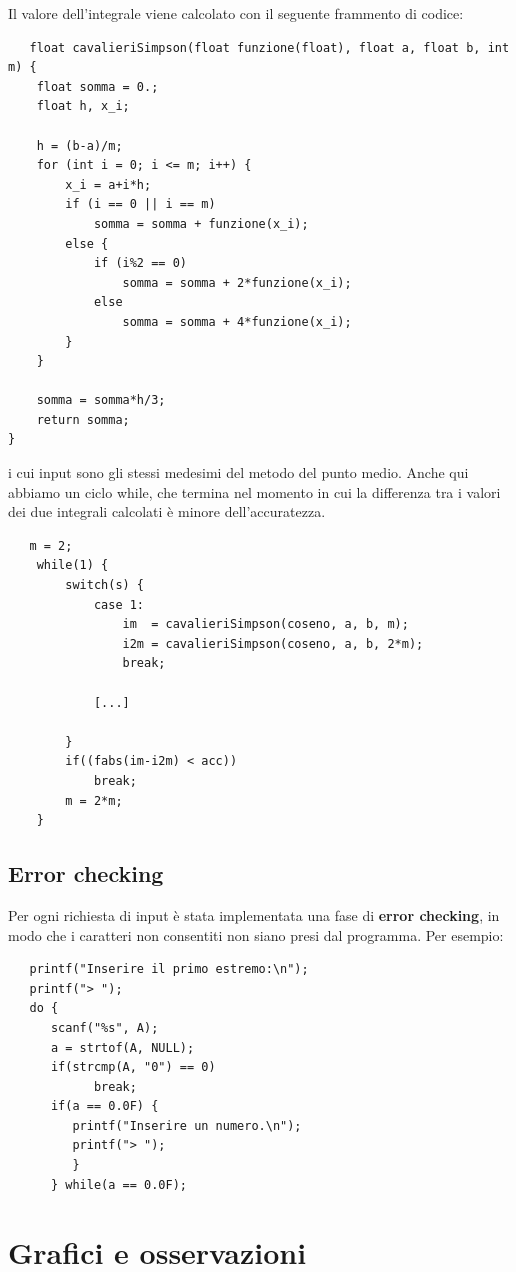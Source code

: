 \documentclass{article}
\begin{document}
Il valore dell'integrale viene calcolato con il seguente frammento di codice:
\begin{lstlisting}
   float cavalieriSimpson(float funzione(float), float a, float b, int m) {
    float somma = 0.;
    float h, x_i;

    h = (b-a)/m;
    for (int i = 0; i <= m; i++) {
        x_i = a+i*h;
        if (i == 0 || i == m)
            somma = somma + funzione(x_i);
        else {
            if (i%2 == 0)
                somma = somma + 2*funzione(x_i); 
            else
                somma = somma + 4*funzione(x_i);
        }
    }

    somma = somma*h/3;
    return somma;
}
\end{lstlisting}
i cui input sono gli stessi medesimi del metodo del punto medio. Anche qui abbiamo un ciclo while, che termina nel momento in cui la differenza tra i valori dei due integrali calcolati è 
minore dell'accuratezza.
\begin{lstlisting}
   m = 2;
    while(1) {
        switch(s) {
            case 1:
                im  = cavalieriSimpson(coseno, a, b, m);
                i2m = cavalieriSimpson(coseno, a, b, 2*m);
                break;

            [...]

        }  
        if((fabs(im-i2m) < acc))
            break;
        m = 2*m;
    }
\end{lstlisting}

\subsection{Error checking}
Per ogni richiesta di input è stata implementata una fase di \textbf{error checking}, in modo che i caratteri non consentiti non siano presi dal programma. Per esempio:
\begin{lstlisting}
   printf("Inserire il primo estremo:\n");
   printf("> ");
   do {
      scanf("%s", A);
      a = strtof(A, NULL);
      if(strcmp(A, "0") == 0)
            break;
      if(a == 0.0F) {
         printf("Inserire un numero.\n");
         printf("> ");
         }
      } while(a == 0.0F);
\end{lstlisting}

\section{Grafici e osservazioni}
\end{document}
